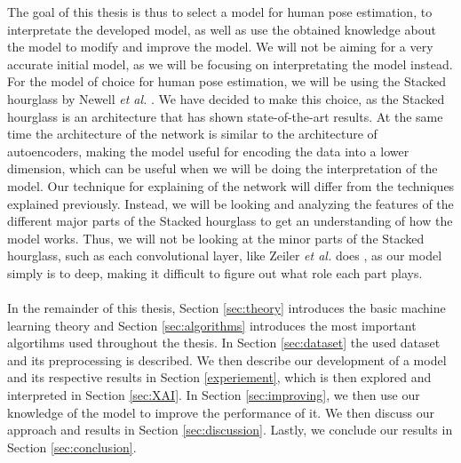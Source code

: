 \documentclass[./main.tex]{subfiles}
\begin{document}
The goal of this thesis is thus to select a model for human pose estimation, to interpretate the developed model, as well as use the obtained knowledge about the model to modify and improve the model. We will not be aiming for a very accurate initial model, as we will be focusing on interpretating the model instead. For the model of choice for human pose estimation, we will be using the Stacked hourglass by Newell \textit{et al.} \cite{Newell}. We have decided to make this choice, as the Stacked hourglass is an architecture that has shown state-of-the-art results. At the same time the architecture of the network is similar to the architecture of autoencoders, making the model useful for encoding the data into a lower dimension, which can be useful when we will be doing the interpretation of the model. Our technique for explaining of the network will differ from the techniques explained previously. Instead, we will be looking and analyzing the features of the different major parts of the Stacked hourglass to get an understanding of how the model works. Thus, we will not be looking at the minor parts of the Stacked hourglass, such as each convolutional layer, like Zeiler \textit{et al.} does \cite{Zeiler}, as our model simply is to deep, making it difficult to figure out what role each part plays.
\\
\\
In the remainder of this thesis, Section \ref{sec:theory} introduces the basic machine learning theory and Section \ref{sec:algorithms} introduces the most important algortihms used throughout the thesis. In Section \ref{sec:dataset} the used dataset and its preprocessing is described. We then describe our development of a model and its respective results in Section \ref{experiement}, which is then explored and interpreted in Section \ref{sec:XAI}. In Section \ref{sec:improving}, we then use our knowledge of the model to improve the performance of it. We then discuss our approach and results in Section \ref{sec:discussion}. Lastly, we conclude our results in Section \ref{sec:conclusion}.
\end{document}
